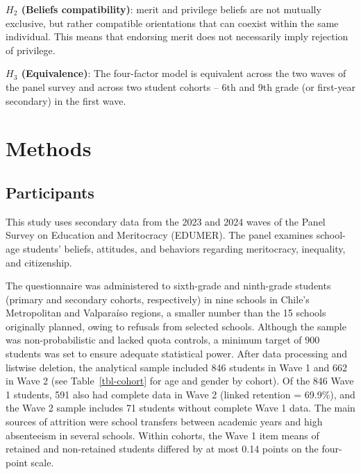 \documentclass[
  11pt,
]{article}
\begin{document}
\textbf{\(H_2\) (Beliefs compatibility)}: merit and privilege beliefs
are not mutually exclusive, but rather compatible orientations that can
coexist within the same individual. This means that endorsing merit does
not necessarily imply rejection of privilege.

\textbf{\(H_3\) (Equivalence)}: The four-factor model is equivalent
across the two waves of the panel survey and across two student cohorts
-- 6th and 9th grade (or first-year secondary) in the first wave.

\section{Methods}\label{methods}

\subsection{Participants}\label{participants}

This study uses secondary data from the 2023 and 2024 waves of the Panel
Survey on Education and Meritocracy (EDUMER). The panel examines
school-age students' beliefs, attitudes, and behaviors regarding
meritocracy, inequality, and citizenship.

The questionnaire was administered to sixth-grade and ninth-grade
students (primary and secondary cohorts, respectively) in nine schools
in Chile's Metropolitan and Valparaíso regions, a smaller number than
the 15 schools originally planned, owing to refusals from selected
schools. Although the sample was non-probabilistic and lacked quota
controls, a minimum target of 900 students was set to ensure adequate
statistical power. After data processing and listwise deletion, the
analytical sample included 846 students in Wave 1 and 662 in Wave 2 (see
Table~\ref{tbl-cohort} for age and gender by cohort). Of the 846 Wave 1
students, 591 also had complete data in Wave 2 (linked retention =
69.9\%), and the Wave 2 sample includes 71 students without complete
Wave 1 data. The main sources of attrition were school transfers between
academic years and high absenteeism in several schools. Within cohorts,
the Wave 1 item means of retained and non-retained students differed by
at most 0.14 points on the four-point scale.
\end{document}
